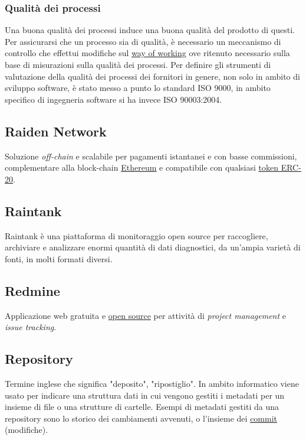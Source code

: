 	\subsubsection{Qualità dei processi}
	\label{sec:qualitaprocesso}
	Una buona qualità dei processi induce una buona qualità del prodotto di questi. Per assicurarsi che un processo sia di qualità, è necessario un meccanismo di controllo che effettui modifiche sul \underline{\hyperref[sec:wow]{\underline{\hyperref[sec:wow]{way of working}}}} ove ritenuto necessario sulla base di misurazioni sulla qualità dei processi. Per definire gli strumenti di valutazione della qualità dei processi dei fornitori in genere, non solo in ambito di sviluppo software, è stato messo a punto lo standard ISO 9000, in ambito specifico di ingegneria software si ha invece ISO 90003:2004.

		\newpage


	\subsection{Raiden Network}
	\label{sec:raiden}
	Soluzione \emph{off-chain} e scalabile per pagamenti istantanei e con basse commissioni, complementare alla block-chain \underline{\hyperref[sec:ethereum]{Ethereum}} e compatibile con qualsiasi \underline{\hyperref[sec:erc20]{token ERC-20}}.


	\subsection{Raintank}
	\label{sec:raintank}
	Raintank è una piattaforma di monitoraggio open source per raccogliere, archiviare e analizzare enormi quantità di dati diagnostici, da un'ampia varietà di fonti, in molti formati diversi.


	\subsection{Redmine}
	\label{sec:redmine}
	Applicazione web gratuita e \underline{\hyperref[sec:opensource]{open source}} per attività di \emph{project management} e \emph{issue tracking}.

	\subsection{Repository}
	\label{sec:repo}
	Termine inglese che significa "deposito", "ripostiglio". In ambito informatico viene usato per indicare una struttura dati in cui vengono gestiti i metadati per un insieme di file o una strutture di cartelle. Esempi di metadati gestiti da una repository sono lo storico dei cambiamenti avvenuti, o l'insieme dei \underline{\hyperref[sec:commit]{commit}} (modifiche).


